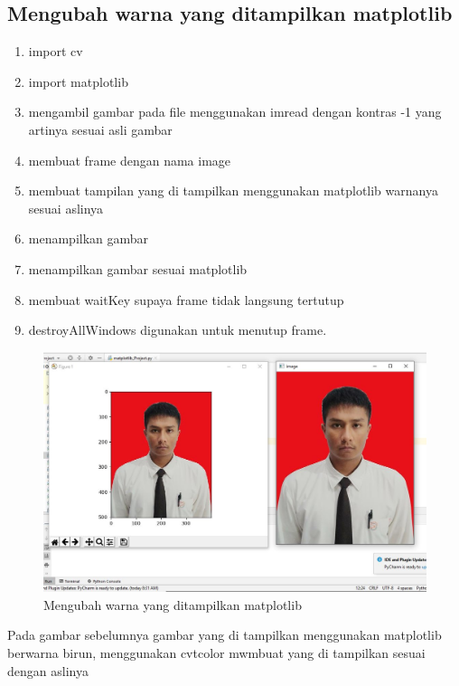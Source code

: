 \subsection{Mengubah warna yang ditampilkan matplotlib}

\begin{enumerate}
	\item import cv
	\item import matplotlib
	\item mengambil gambar pada file menggunakan imread dengan kontras -1 yang artinya sesuai asli gambar
	\item membuat frame dengan nama image
	\item membuat tampilan yang di tampilkan menggunakan matplotlib warnanya sesuai aslinya
	\item menampilkan gambar
	\item menampilkan gambar sesuai matplotlib
	\item membuat waitKey supaya frame tidak langsung tertutup
	\item destroyAllWindows digunakan untuk menutup frame.
\end{enumerate}

\newpage
\begin{figure}[ht]
\centering
\includegraphics[scale=0.5]{figures/2,47.jpg}
\caption{Mengubah warna yang ditampilkan matplotlib}
\label{contoh}
\end{figure}
Pada gambar sebelumnya gambar yang di tampilkan menggunakan matplotlib berwarna birun, menggunakan cvtcolor mwmbuat yang di tampilkan sesuai dengan aslinya

